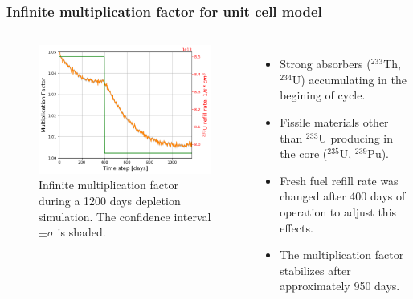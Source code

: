 \begin{frame}
  \frametitle{Infinite multiplication factor for unit cell model}
    \begin{columns}
    \column[t]{7cm}
   \vspace{-0.35in}
  \begin{figure}[t]
   \hspace*{-0.2in}
   \includegraphics[height=0.75\textheight]{./images/keff.png}
   \vspace{-0.05in}
   \caption{Infinite multiplication factor during a 1200 days depletion simulation. The confidence interval $\pm\sigma$ is shaded.}
    \end{figure}

    \column[t]{4.5cm}
       \begin{itemize}
        \item Strong absorbers ($^{233}$Th,$^{234}$U) accumulating in the begining of cycle. 
   		\item Fissile materials other than $^{233}$U producing in the core ($^{235}$U, $^{239}$Pu).
   		\item Fresh fuel refill rate was changed after 400 days of operation to adjust this effects.
   		\item The multiplication factor stabilizes after approximately 950 days.
       \end{itemize}
     \end{columns}
\end{frame}

